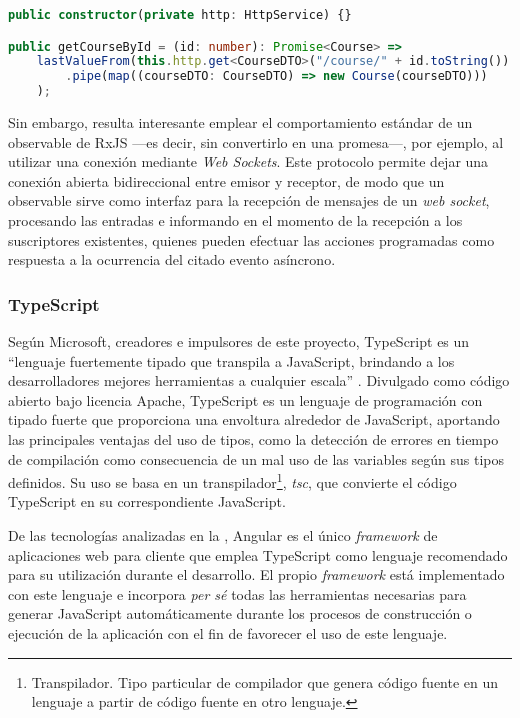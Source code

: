 \begin{lstlisting}[language=TypeScript,caption={Ejemplo de petición HTTP con el cliente de Angular (dependencia inyectada) y un observable de RxJS.},label=cod:reqHttpAngular]
public constructor(private http: HttpService) {}

public getCourseById = (id: number): Promise<Course> =>
    lastValueFrom(this.http.get<CourseDTO>("/course/" + id.toString())
        .pipe(map((courseDTO: CourseDTO) => new Course(courseDTO)))
    );
\end{lstlisting}

Sin embargo, resulta interesante emplear el comportamiento estándar de un observable de RxJS ---es decir, sin convertirlo en una promesa---, por ejemplo, al utilizar una conexión mediante \textit{Web Sockets}. Este protocolo permite dejar una conexión abierta bidireccional entre emisor y receptor, de modo que un observable sirve como interfaz para la recepción de mensajes de un \textit{web socket}, procesando las entradas e informando en el momento de la recepción a los suscriptores existentes, quienes pueden efectuar las acciones programadas como respuesta a la ocurrencia del citado evento asíncrono.

\subsubsection{TypeScript}
\label{subsec:tecTS}
Según Microsoft, creadores e impulsores de este proyecto, TypeScript es un ``lenguaje fuertemente tipado que transpila a JavaScript, brindando a los desarrolladores mejores herramientas a cualquier escala'' \cite{TypeScript}. Divulgado como código abierto bajo licencia Apache, TypeScript es un lenguaje de programación con tipado fuerte que proporciona una envoltura alrededor de JavaScript, aportando las principales ventajas del uso de tipos, como la detección de errores en tiempo de compilación como consecuencia de un mal uso de las variables según sus tipos definidos. Su uso se basa en un transpilador\footnote{Transpilador. Tipo particular de compilador que genera código fuente en un lenguaje a partir de código fuente en otro lenguaje.}, \textit{tsc}, que convierte el código TypeScript en su correspondiente JavaScript.

De las tecnologías analizadas en la , Angular es el único \textit{framework} de aplicaciones web para cliente que emplea TypeScript como lenguaje recomendado para su utilización durante el desarrollo. El propio \textit{framework} está implementado con este lenguaje e incorpora \textit{per sé} todas las herramientas necesarias para generar JavaScript automáticamente durante los procesos de construcción o ejecución de la aplicación con el fin de favorecer el uso de este lenguaje.

